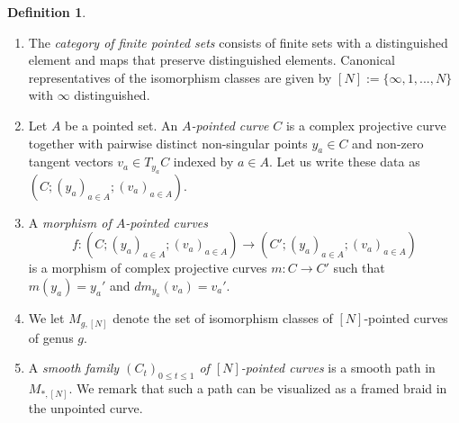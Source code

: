 \documentclass[11pt]{report}
\theoremstyle{definition}
\newtheorem{definition}[theorem]{Definition}
\theoremstyle{remark}
\theoremstyle{remark}
\begin{document}
\begin{definition}
\begin{enumerate}[label=(\roman*)]
\item The \emph{category of finite pointed sets} consists of finite sets with a distinguished element and maps that preserve distinguished elements. Canonical representatives of the isomorphism classes are given by $[N] := \{ \infty,1,...,N \}$ with $\infty$ distinguished.
\item Let $A$ be a pointed set. An \emph{$A$-pointed curve} $C$ is a complex projective curve together with pairwise distinct non-singular points $y_a \in C$ and non-zero tangent vectors $v_a \in T_{y_a} C$ indexed by $a \in A$. Let us write these data as $(C;(y_a)_{a \in A};(v_a)_{a \in A})$.
\item A \emph{morphism of $A$-pointed curves}
\begin{equation*}
f: (C;(y_a)_{a \in A};(v_a)_{a \in A}) \to (C';(y_{a})_{a \in A};(v_{a})_{a \in A})
\end{equation*}
is a morphism of complex projective curves $m: C \to C'$ such that $m(y_a) = y_a'$ and $dm_{y_a}(v_a) = v_a'$.
\item We let $M_{g,[N]}$ denote the set of isomorphism classes of $[N]$-pointed curves of genus $g$.
\item A \emph{smooth family $(C_t)_{0 \leq t \leq 1}$ of $[N]$-pointed curves} is a smooth path in $M_{*,[N]}$. We remark that such a path can be visualized as a framed braid in the unpointed curve.
\end{enumerate}
\end{definition}
\end{document}
